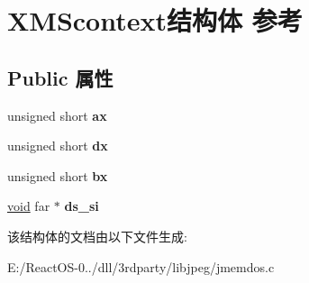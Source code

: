 \hypertarget{struct_x_m_scontext}{}\section{X\+M\+Scontext结构体 参考}
\label{struct_x_m_scontext}
\subsection*{Public 属性}
\begin{DoxyCompactItemize}
\item 
\mbox{\label{struct_x_m_scontext_a5604354ae35cb3ce4764ccff173d0af2}} 
unsigned short {\bfseries ax}
\item 
\mbox{\label{struct_x_m_scontext_aa1c23f775fc18b65041299b064e43e0b}} 
unsigned short {\bfseries dx}
\item 
\mbox{\label{struct_x_m_scontext_a25a611357ba455485f4d5db3a3c0a772}} 
unsigned short {\bfseries bx}
\item 
\mbox{\label{struct_x_m_scontext_ae16003451dbbc0c4dca43c895152441c}} 
\hyperlink{interfacevoid}{void} far $\ast$ {\bfseries ds\+\_\+si}
\end{DoxyCompactItemize}


该结构体的文档由以下文件生成\+:\begin{DoxyCompactItemize}
\item 
E\+:/\+React\+O\+S-\/0../dll/3rdparty/libjpeg/jmemdos.\+c\end{DoxyCompactItemize}
